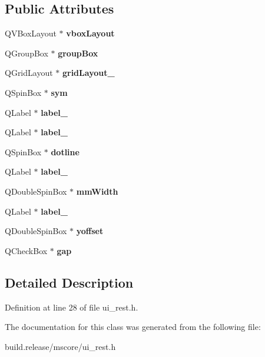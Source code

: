 \subsection*{Public Attributes}
\begin{DoxyCompactItemize}
\item 
\mbox{\label{class_ui___rest_a359545dbef25308f3735c9e3c8e378d8}} 
Q\+V\+Box\+Layout $\ast$ {\bfseries vbox\+Layout}
\item 
\mbox{\label{class_ui___rest_a79e0d3860338b893dc23f291acc85cd6}} 
Q\+Group\+Box $\ast$ {\bfseries group\+Box}
\item 
\mbox{\label{class_ui___rest_a5622bcd84567a440cf61f12a47bdc87e}} 
Q\+Grid\+Layout $\ast$ {\bfseries grid\+Layout\+\_}
\item 
\mbox{\label{class_ui___rest_af8464941311e07f1d1372d4ad7026096}} 
Q\+Spin\+Box $\ast$ {\bfseries sym}
\item 
\mbox{\label{class_ui___rest_aba54889cd5f6d930ffd867c72f810fb2}} 
Q\+Label $\ast$ {\bfseries label\+\_}
\item 
\mbox{\label{class_ui___rest_a36be548193748edbbc6e330cade2d9e8}} 
Q\+Label $\ast$ {\bfseries label\+\_}
\item 
\mbox{\label{class_ui___rest_aece3e28b6eafbfc82caa4a455bb0fa02}} 
Q\+Spin\+Box $\ast$ {\bfseries dotline}
\item 
\mbox{\label{class_ui___rest_ae949694ee42f3191fb474db1f4aaf480}} 
Q\+Label $\ast$ {\bfseries label\+\_}
\item 
\mbox{\label{class_ui___rest_a0227ff5d77379e160c20e3818528f86f}} 
Q\+Double\+Spin\+Box $\ast$ {\bfseries mm\+Width}
\item 
\mbox{\label{class_ui___rest_ab8c95d25b9428b65774a46e190775a90}} 
Q\+Label $\ast$ {\bfseries label\+\_}
\item 
\mbox{\label{class_ui___rest_aeb4842a7c3947fbec9915a1710f360fb}} 
Q\+Double\+Spin\+Box $\ast$ {\bfseries yoffset}
\item 
\mbox{\label{class_ui___rest_a556260b9f6ea1f0f6cc0ca9e6841ef32}} 
Q\+Check\+Box $\ast$ {\bfseries gap}
\end{DoxyCompactItemize}


\subsection{Detailed Description}


Definition at line 28 of file ui\+\_\+rest.\+h.



The documentation for this class was generated from the following file\+:\begin{DoxyCompactItemize}
\item 
build.\+release/mscore/ui\+\_\+rest.\+h\end{DoxyCompactItemize}
